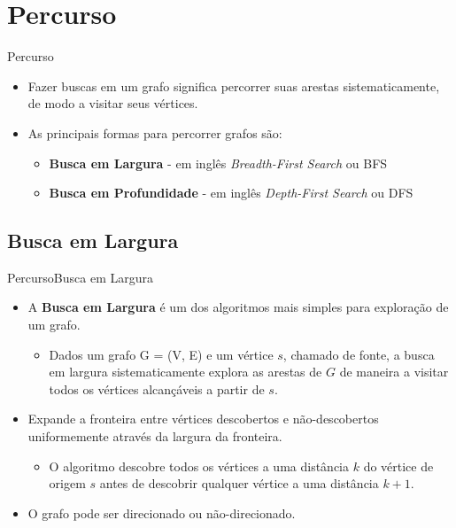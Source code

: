 \documentclass[aspectratio=169]{beamer}
\begin{document}
\section{Percurso}

\begin{frame}{Percurso}
\begin{itemize}
\item Fazer buscas em um grafo significa percorrer suas arestas sistematicamente, de modo a visitar seus vértices.
\item As principais formas para percorrer grafos são:
\begin{itemize}
\item {\bf Busca em Largura} - em inglês {\it Breadth-First Search} ou BFS
\item {\bf Busca em Profundidade} - em inglês {\it Depth-First Search} ou DFS
\end{itemize}
\end{itemize}
\end{frame}

\subsection{Busca em Largura}

\begin{frame}{Percurso}{Busca em Largura}
\begin{itemize}
\item A {\bf Busca em Largura} é um dos algoritmos mais simples para exploração de um grafo.
\begin{itemize}
\item Dados um grafo G = (V, E) e um vértice $s$, chamado de fonte, a busca em largura sistematicamente explora as arestas de $G$ de maneira a visitar todos os vértices alcançáveis a partir de $s$.
\end{itemize}
\item  Expande a fronteira entre vértices descobertos e não-descobertos uniformemente através da largura da fronteira.
  \begin{itemize}
  \item O algoritmo descobre todos os vértices a uma distância $k$ do vértice de origem $s$ antes de descobrir qualquer vértice a uma distância $k + 1$.
  \end{itemize}
\item O grafo pode ser direcionado ou não-direcionado.
\end{itemize}
\end{frame}
\end{document}
